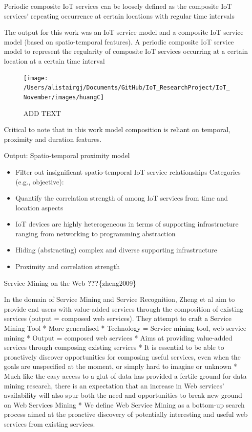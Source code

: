 \documentclass[11pt,]{article}
\providecommand{\tightlist}{%
  \setlength{\itemsep}{0pt}\setlength{\parskip}{0pt}}
\begin{document}
Periodic composite IoT services can be loosely defined as the composite
IoT services' repeating occurrence at certain locations with regular
time intervals

The output for this work was an IoT service model and a composite IoT
service model (based on spatio-temporal features). A periodic composite
IoT service model to represent the regularity of composite IoT services
occurring at a certain location at a certain time interval

\begin{figure}[H]

{\centering \texttt{[image: /Users/alistairgj/Documents/GitHub/IoT\_ResearchProject/IoT\_November/images/huangC]} 

}

\caption{ADD TEXT}\label{fig:unnamed-chunk-8}
\end{figure}

Critical to note that in this work model composition is reliant on
temporal, proximity and duration features.

Output: Spatio-temporal proximity model

\begin{itemize}
\tightlist
\item
  Filter out insignificant spatio-temporal IoT service relationships
  Categories (e.g., objective):
\item
  Quantify the correlation strength of among IoT services from time and
  location aspects
\item
  IoT devices are highly heterogeneous in terms of supporting
  infrastructure ranging from networking to programming abstraction
\item
  Hiding (abstracting) complex and diverse supporting infrastructure
\item
  Proximity and correlation strength
\end{itemize}

Service Mining on the Web \textbf{???}\{zheng2009\}

In the domain of Service Mining and Service Recognition, Zheng et al aim
to provide end users with value-added services through the composition
of existing services (output = composed web services). They attempt to
craft a Service Mining Tool * More generalised * Technology = Service
mining tool, web service mining * Output = composed web services * Aims
at providing value-added services through composing existing services *
It is essential to be able to proactively discover opportunities for
composing useful services, even when the goals are unspecified at the
moment, or simply hard to imagine or unknown * Much like the easy access
to a glut of data has provided a fertile ground for data mining
research, there is an expectation that an increase in Web services'
availability will also spur both the need and opportunities to break new
ground on Web Services Mining * We define Web Service Mining as a
bottom-up search process aimed at the proactive discovery of potentially
interesting and useful web services from existing services.
\end{document}
